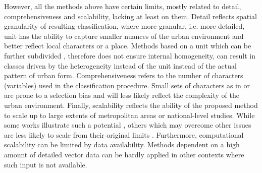 However, all the methods above have certain limits, mostly related to detail, comprehensiveness and scalability, lacking at least on them. Detail reflects spatial granularity of resulting classification, where more granular, i.e. more detailed, unit has the ability to capture smaller nuances of the urban environment and better reflect local characters or a place. Methods based on a unit which can be further subdivided \citep{dibble2019origin,jochem2020,araldi2019,gil2012}, therefore does not ensure internal homogeneity, can result in classes driven by the heterogeneity instead of the unit instead of the actual pattern of urban form. Comprehensiveness refers to the number of characters (variables) used in the classification procedure. Small sets of characters as in \cite{bobkova2019} or \cite{serra2018a} are prone to a selection bias and will less likely reflect the complexity of the urban environment. Finally, scalability reflects the ability of the proposed method to scale up to large extents of metropolitan areas or national-level studies. While some works illustrate such a potential \citep{jochem2020, schirmer2015,bobkova2019,araldi2019}, others which may overcome other issues are less likely to scale from their original limits \citep{dibble2019origin}. Furthermore, computational scalability can be limited by data availability. Methods dependent on a high amount of detailed vector data \citep{bobkova2019} can be hardly applied in other contexts where such input is not available.

